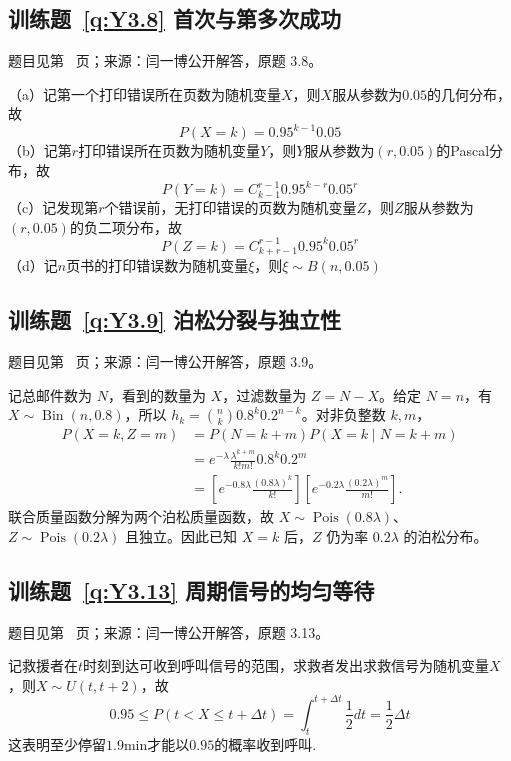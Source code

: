 \subsection*{训练题~\ref{q:Y3.8} 首次与第多次成功}\label{a:Y3.8}{\small 题目见第~\pageref{q:Y3.8} 页；来源：闫一博公开解答，原题 3.8。}
\begin{solve}
（a）记第一个打印错误所在页数为随机变量$X$，则$X$服从参数为$0.05$的几何分布，故
\[P(X=k)=0.95^{k-1} 0.05\]
（b）记第$r$打印错误所在页数为随机变量$Y$，则$Y$服从参数为$(r,0.05)$的Pascal分布，故
\[P(Y = k) = C_{k - 1}^{r - 1}{0.95^{k - r}}{0.05^r}\]
（c）记发现第$r$个错误前，无打印错误的页数为随机变量$Z$，则$Z$服从参数为$(r,0.05)$的负二项分布，故 
\[P(Z = k) = C_{k + r - 1}^{r - 1}{0.95^k}{0.05^r}\]
（d）记$n$页书的打印错误数为随机变量$\xi$，则$\xi\sim B(n,0.05)$
\end{solve}

\subsection*{训练题~\ref{q:Y3.9} 泊松分裂与独立性}\label{a:Y3.9}{\small 题目见第~\pageref{q:Y3.9} 页；来源：闫一博公开解答，原题 3.9。}
\begin{solve}记总邮件数为 $N$，看到的数量为 $X$，过滤数量为 $Z=N-X$。给定 $N=n$，有 $X\sim\operatorname{Bin}(n,0.8)$，所以 $h_k=\binom nk0.8^k0.2^{n-k}$。对非负整数 $k,m$，\[\begin{aligned}P(X=k,Z=m)&=P(N=k+m)P(X=k\mid N=k+m)\\&=e^{-\lambda}\frac{\lambda^{k+m}}{k!m!}0.8^k0.2^m\\&=\left[e^{-0.8\lambda}\frac{(0.8\lambda)^k}{k!}\right]\left[e^{-0.2\lambda}\frac{(0.2\lambda)^m}{m!}\right].\end{aligned}\]联合质量函数分解为两个泊松质量函数，故 $X\sim\operatorname{Pois}(0.8\lambda)$、$Z\sim\operatorname{Pois}(0.2\lambda)$ 且独立。因此已知 $X=k$ 后，$Z$ 仍为率 $0.2\lambda$ 的泊松分布。\end{solve}

\subsection*{训练题~\ref{q:Y3.13} 周期信号的均匀等待}\label{a:Y3.13}{\small 题目见第~\pageref{q:Y3.13} 页；来源：闫一博公开解答，原题 3.13。}
\begin{solve}
记救援者在$t$时刻到达可收到呼叫信号的范围，求救者发出求救信号为随机变量$X$，则$X\sim U(t,t+2)$，故
\[0.95 \leqslant P(t < X \leqslant t + \Delta t) = \int_t^{t + \Delta t} {\frac{1}{2}dt}  = \frac{1}{2}\Delta t\]
这表明至少停留$1.9$min才能以$0.95$的概率收到呼叫.
\end{solve}

